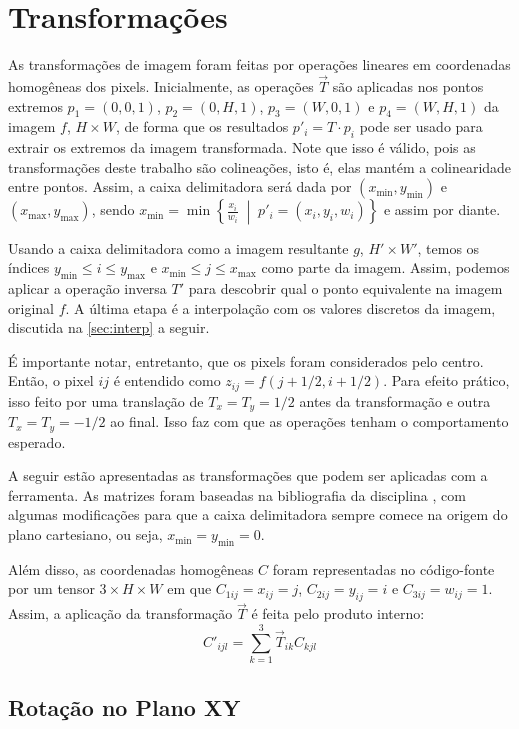 \section{Transformações} \label{sec:transformacoes}

As transformações de imagem foram feitas por operações lineares em coordenadas homogêneas dos pixels. Inicialmente, as operações $\vec{T}$ são aplicadas nos pontos extremos $p_1 = (0, 0, 1)$, $p_2 = (0, H, 1)$, $p_3 = (W, 0, 1)$ e $p_4 = (W, H, 1)$ da imagem $f$, $H \times W$, de forma que os resultados $p'_i = T \cdot p_i$ pode ser usado para extrair os extremos da imagem transformada. Note que isso é válido, pois as transformações deste trabalho são colineações, isto é, elas mantém a colinearidade entre pontos. Assim, a caixa delimitadora \autocite{bbox} será dada por $(x_{\min}, y_{\min})$ e $(x_{\max}, y_{\max})$, sendo $x_{\min} = \min\left\{ \frac{x_i}{w_i} \;\middle|\; p'_i = (x_i, y_i, w_i)\right\}$ e assim por diante.

Usando a caixa delimitadora como a imagem resultante $g$, $H' \times W'$, temos os índices $y_{\min} \leq i \leq y_{\max}$ e $x_{\min} \leq j \leq x_{\max}$ como parte da imagem. Assim, podemos aplicar a operação inversa $T'$ para descobrir qual o ponto equivalente na imagem original $f$. A última etapa é a interpolação com os valores discretos da imagem, discutida na \cref{sec:interp} a seguir.

É importante notar, entretanto, que os pixels foram considerados pelo centro. Então, o pixel $ij$ é entendido como $z_{ij} = f(j + 1/2, i + 1/2)$. Para efeito prático, isso feito por uma translação de $T_x = T_y = 1/2$ antes da transformação e outra $T_x = T_y = -1/2$ ao final. Isso faz com que as operações tenham o comportamento esperado.

A seguir estão apresentadas as transformações que podem ser aplicadas com a ferramenta. As matrizes foram baseadas na bibliografia da disciplina \autocite{helio}, com algumas modificações para que a caixa delimitadora sempre comece na origem do plano cartesiano, ou seja, $x_{\min} = y_{\min} = 0$.

Além disso, as coordenadas homogêneas $C$ foram representadas no código-fonte por um tensor $3 \times H \times W$ em que $C_{1ij} = x_{ij} = j$, $C_{2ij} = y_{ij} = i$ e $C_{3ij} = w_{ij} = 1$. Assim, a aplicação da transformação $\vec{T}$ é feita pelo produto interno:
\[
    C'_{ijl} = \sum_{k = 1}^3 \vec{T}_{ik} C_{kjl}
\]

\subsection{Rotação no Plano XY}

